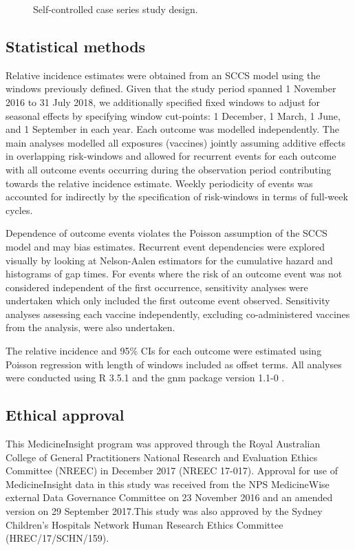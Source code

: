 \documentclass[review, endfloat]{elsarticle}
\begin{document}
\begin{figure}
\caption{Self-controlled case series study design.}
\label{fig:sccs_design}
\end{figure}

\subsection{Statistical methods}
\label{sec:stat_methods}

Relative incidence estimates were obtained from an SCCS model \citep{farrington2018} using the windows previously defined. Given that the study period spanned 1 November 2016 to 31 July 2018, we additionally specified fixed windows to adjust for seasonal effects by specifying window cut-points: 1 December, 1 March, 1 June, and 1 September in each year. Each outcome was modelled independently. The main analyses modelled all exposures (vaccines) jointly assuming additive effects in overlapping risk-windows and allowed for recurrent events for each outcome with all outcome events occurring during the observation period contributing towards the relative incidence estimate. Weekly periodicity of events was accounted for indirectly by the specification of risk-windows in terms of full-week cycles.

Dependence of outcome events violates the Poisson assumption of the SCCS model and may bias estimates. Recurrent event dependencies were explored visually by looking at Nelson-Aalen estimators for the cumulative hazard and histograms of gap times. For events where the risk of an outcome event was not considered independent of the first occurrence, sensitivity analyses were undertaken which only included the first outcome event observed.  Sensitivity analyses assessing each vaccine independently, excluding co-administered vaccines from the analysis, were also undertaken. 

The relative incidence and 95\% CIs for each outcome were estimated using Poisson regression with length of windows included as offset terms. All analyses were conducted using R 3.5.1 \citep{rmanual} and the gnm package version 1.1-0 \citep{rgnm}.

\subsection{Ethical approval}

This MedicineInsight program was approved through the Royal Australian College of General Practitioners National Research and Evaluation Ethics Committee (NREEC) in December 2017 (NREEC 17-017). Approval for use of MedicineInsight data in this study was received from the NPS MedicineWise external Data Governance Committee on 23 November 2016 and an amended version on 29 September 2017.This study was also approved by the Sydney Children’s Hospitals Network Human Research Ethics Committee (HREC/17/SCHN/159). 
\end{document}
